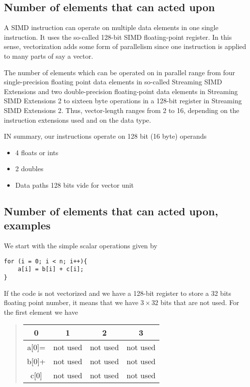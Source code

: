 \documentclass[%
oneside,                 %
final,                   %
10pt]{article}
\begin{document}
\subsection*{Number of elements that can acted upon}
A SIMD instruction can operate  on multiple data elements in one single instruction.
It uses the so-called 128-bit SIMD floating-point register. 
In this sense, vectorization adds some form of parallelism since one instruction is applied  
to many parts of say a vector.

The number of elements which can be operated on in parallel
range from four single-precision floating point data elements in so-called 
Streaming SIMD Extensions and two double-precision floating-point data
elements in Streaming SIMD Extensions 2 to sixteen byte operations in
a 128-bit register in Streaming SIMD Extensions 2. Thus, vector-length
ranges from 2 to 16, depending on the instruction extensions used and
on the data type. 

IN summary, our instructions  operate on 128 bit (16 byte) operands
\begin{itemize}
\item 4 floats or ints

\item 2 doubles

\item Data paths 128 bits vide for vector unit
\end{itemize}

\noindent
\subsection*{Number of elements that can acted upon, examples}
We start with the simple scalar operations given by
\begin{verbatim}
for (i = 0; i < n; i++){
    a[i] = b[i] + c[i];
}
\end{verbatim}
If the code is not vectorized  and we have a 128-bit register to store a 32 bits floating point number,
it means that we have $3\times 32$ bits that are not used. For the first element we have



\begin{quote}
\begin{tabular}{cccc}
\hline
\multicolumn{1}{c}{ 0 } & \multicolumn{1}{c}{ 1 } & \multicolumn{1}{c}{ 2 } & \multicolumn{1}{c}{ 3 } \\
\hline
a[0]= & not used & not used & not used \\
\hline
b[0]+ & not used & not used & not used \\
\hline
c[0]  & not used & not used & not used \\
\hline
\end{tabular}
\end{quote}
\end{document}
